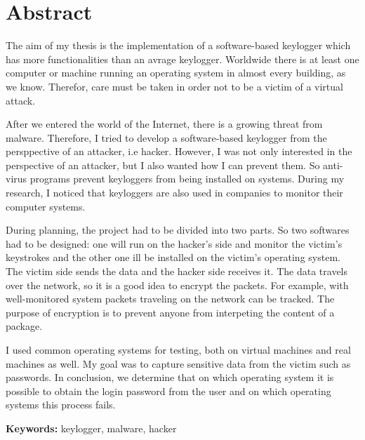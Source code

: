 \chapter*{Abstract}
The aim of my thesis is the implementation of a software-based keylogger which has more functionalities than an avrage keylogger. Worldwide there is at least one computer or machine running an operating system in almost every building, as we know. Therefor, care must be taken in order not to be a victim of a virtual attack.

After we entered the world of the Internet, there is a growing threat from malware. Therefore, I tried to develop a software-based keylogger from the persppective of an attacker, i.e hacker. However, I was not only interested in the perspective of an attacker, but I also wanted how I can prevent them. So anti-virus programs prevent keyloggers from being installed on systems. During my research, I noticed that keyloggers are also used in companies to monitor their computer systems.

During planning, the project had to be divided into two parts. So two softwares had to be designed: one will run on the hacker's side and monitor the victim's keystrokes and the other one ill be installed on the victim's operating system. The victim side sends the data and the hacker side receives it. The data travels over the network, so it is a good idea to encrypt the packets. For example, with well-monitored system packets traveling on the network can be tracked. The purpose of encryption is to prevent anyone from interpeting the content of a package.

I used common operating systems for testing, both on virtual machines and real machines as well. My goal was to capture sensitive data from the victim such as passwords. In conclusion, we determine that on which operating system it is possible to obtain the login password from the user and on which operating systems this process fails.

\vspace*{2cm}

\noindent \textbf{Keywords:} keylogger, malware, hacker

\vfill
\dolgozatnyelve
{}